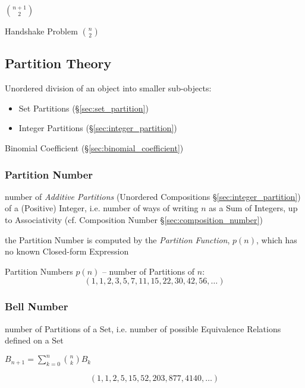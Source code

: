 $\binom{n+1}{2}$

Handshake Problem $\binom{n}{2}$



\subsection{Partition Theory}\label{sec:partition_theory}

Unordered division of an object into smaller sub-objects:
\begin{itemize}
  \item Set Partitions (\S\ref{sec:set_partition})
  \item Integer Partitions (\S\ref{sec:integer_partition})
\end{itemize}

Binomial Coefficient (\S\ref{sec:binomial_coefficient})



\subsubsection{Partition Number}\label{sec:partition_number}

number of \emph{Additive Partitions} (Unordered Compositions
\S\ref{sec:integer_partition}) of a (Positive) Integer, i.e. number of ways of
writing $n$ as a Sum of Integers, up to Associativity (cf. Composition Number
\S\ref{sec:composition_number})

the Partition Number is computed by the \emph{Partition Function}, $p(n)$, which
has no known Closed-form Expression

Partition Numbers $p(n)$ -- number of Partitions of $n$:
\[
  (1, 1, 2, 3, 5, 7, 11, 15, 22, 30, 42, 56, \ldots)
\]



\subsubsection{Bell Number}\label{sec:bell_number}

number of Partitions of a Set, i.e. number of possible Equivalence Relations
defined on a Set

$B_{n+1} = \sum_{k=0}^n \binom{n}{k} B_k$

\[
  (1, 1, 2, 5, 15, 52, 203, 877, 4140, \ldots)
\]



